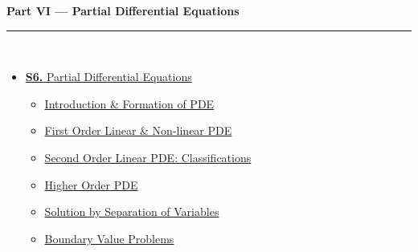 \documentclass[12pt,a4paper]{article}
\begin{document}
\begin{tcolorbox}[breakable,colback=cF!5,colframe=cF,boxrule=1pt,arc=5pt,
  left=8pt,right=8pt,top=8pt,bottom=8pt,before skip=4pt]
  {\large\bfseries\textcolor{cF}{Part VI --- Partial Differential Equations}}\\[5pt]
  \textcolor{cF!40}{\rule{\textwidth}{0.4pt}}\\[3pt]
  \small\begin{itemize}[leftmargin=1.2em,itemsep=1pt,label={\textcolor{cF}{$\triangleright$}}]
    \item \hyperref[sec:S6]{\textbf{S6.} Partial Differential Equations}
      \begin{itemize}[leftmargin=1.5em,itemsep=0pt,label={\textcolor{cF}{$\cdot$}}]
        \item \hyperref[sub:s6-formation]{Introduction \& Formation of PDE}
        \item \hyperref[sub:s6-first]{First Order Linear \& Non-linear PDE}
        \item \hyperref[sub:s6-second]{Second Order Linear PDE: Classifications}
        \item \hyperref[sub:s6-higher]{Higher Order PDE}
        \item \hyperref[sub:s6-separation]{Solution by Separation of Variables}
        \item \hyperref[sub:s6-bvp]{Boundary Value Problems}
      \end{itemize}
  \end{itemize}
\end{tcolorbox}

\vspace{6pt}
\end{document}
